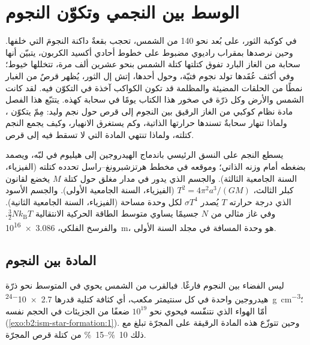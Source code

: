 \chapter{الوسط بين النجمي وتكوّن النجوم}\label{ch:b2:ism-star-formation}

في كوكبة الثور، على بُعد نحو \qty{140}{\parsec} من الشمس، تحجب بقعةٌ داكنة
النجومَ التي خلفها. وحين نرصدها بمقراب راديوي مضبوط على خطوط أحادي أكسيد
الكربون، يتبيّن أنها سحابة من الغاز البارد تفوق كتلتها كتلة الشمس بنحو عشرين
ألف مرة، تتخللها خيوط؛ وفي أكثف عُقَدها تولد نجوم فتيّة، وحول أحدها، إتش إل
الثور، يُظهر قرصٌ من الغبار نمطًا من الحلقات المضيئة والمظلمة قد تكون الكواكب
آخذة في التكوّن فيه. لقد كانت الشمس والأرض وكل ذرّة في صخور هذا الكتاب يومًا
في سحابة كهذه. يتتبّع هذا الفصل مادة نظام كوكبي من الغاز الرقيق بين النجوم
إلى قرص حول نجم وليد: مِمّ يتكوّن ، ولماذا تنهار سحابةٌ
تسندها حرارتها الذاتية، وكم يستغرق الانهيار، وكيف يجمع النجم كتلته، ولماذا
تنتهي المادة التي لا تسقط فيه إلى قرص.

\begin{recall}
يسطع النجم على النسق الرئيسي باندماج الهيدروجين إلى هيليوم في
لبّه، ويصمد بضغطه أمام وزنه الذاتي؛ وموقعه في مخطط هرتزشبرونغ--راسل
تحدده كتلته (الفيزياء، السنة الجامعية الثالثة). والجسم الذي يدور في مدار مغلق حول كتلة $M$ يخضع لقانون كبلر
الثالث، $T^2 = 4\pi^2 a^3/(GM)$ (الفيزياء، السنة الجامعية الأولى). والجسم الأسود
الذي درجة حرارته $T$ يُصدر $\sigma T^4$ لكل وحدة مساحة (الفيزياء، السنة الجامعية
الثانية). وفي غاز مثالي من $N$ جسيمًا يساوي متوسط الطاقة الحركية
الانتقالية $\tfrac32 N k_{\mathrm B} T$. والفرسخ الفلكي،
\qty{3.086e16}{m}، هو وحدة المسافة في مجلد السنة الأولى.
\end{recall}

\section{المادة بين النجوم}

ليس الفضاء بين النجوم فارغًا. فبالقرب من الشمس يحوي في المتوسط نحو
ذرّة هيدروجين واحدة في كل سنتيمتر مكعب، أي كثافة كتلية قدرها
\qty{2.7e-24}{g.cm^{-3}}؛ أمّا الهواء الذي نتنفّسه فيحوي نحو $10^{19}$ ضعفًا من
الجزيئات في الحجم نفسه (\cref{exo:b2:ism-star-formation:1}). وحين تتوزّع هذه المادة الرقيقة على المجرّة
تبلغ مع ذلك \qtyrange{10}{15}{\percent} من كتلة
قرص المجرّة.

